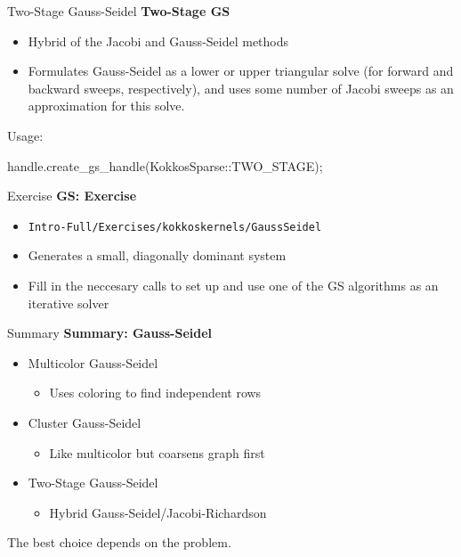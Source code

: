 \begin{frame}[fragile]{Two-Stage Gauss-Seidel}
\textbf{Two-Stage GS}
\begin{itemize}
  \item Hybrid of the Jacobi and Gauss-Seidel methods
  \item Formulates Gauss-Seidel as a lower or upper triangular solve (for forward and backward sweeps, respectively),
    and uses some number of Jacobi sweeps as an approximation for this solve.
\end{itemize}

Usage:

\begin{code}
  handle.create_gs_handle(KokkosSparse::TWO_STAGE);
\end{code}
\end{frame}

\begin{frame}[fragile]{Exercise}
\textbf{GS: Exercise}
\begin{itemize}
  \item \verb!Intro-Full/Exercises/kokkoskernels/GaussSeidel!
  \item Generates a small, diagonally dominant system
  \item Fill in the neccesary calls to set up and use one of the GS algorithms as an iterative solver
\end{itemize}
\end{frame}

\begin{frame}[fragile]{Summary}
\textbf{Summary: Gauss-Seidel}
\begin{itemize}
  \item Multicolor Gauss-Seidel
  \begin{itemize}
    \item Uses coloring to find independent rows
  \end{itemize}
  \item Cluster Gauss-Seidel
  \begin{itemize}
    \item Like multicolor but coarsens graph first
  \end{itemize}
  \item Two-Stage Gauss-Seidel
  \begin{itemize}
    \item Hybrid Gauss-Seidel/Jacobi-Richardson
  \end{itemize}
\end{itemize}

The best choice depends on the problem.

\end{frame}

